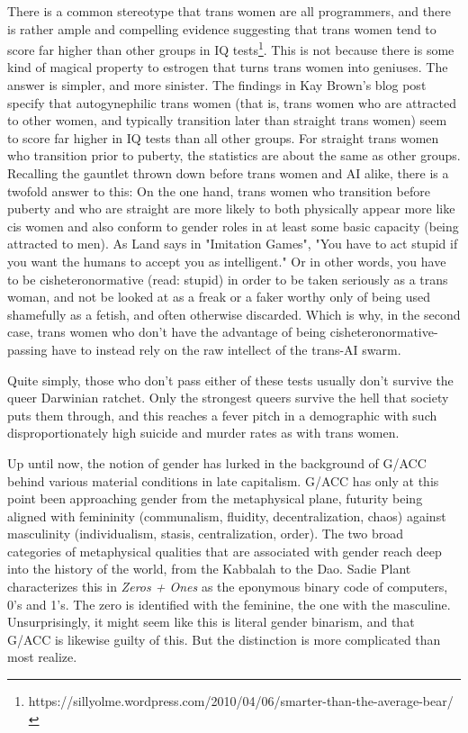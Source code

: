 \documentclass[12pt, a5paper, twoside, openright]{memoir}
\begin{document}
There is a common stereotype that trans women are all programmers, and there is rather ample and compelling evidence suggesting that trans women tend to score far higher than other groups in IQ tests\footnote{https://sillyolme.wordpress.com/2010/04/06/smarter-than-the-average-bear/}. This is not because there is some kind of magical property to estrogen that turns trans women into geniuses. The answer is simpler, and more sinister. The findings in Kay Brown's blog post specify that autogynephilic trans women (that is, trans women who are attracted to other women, and typically transition later than straight trans women) seem to score far higher in IQ tests than all other groups. For straight trans women who transition prior to puberty, the statistics are about the same as other groups. Recalling the gauntlet thrown down before trans women and AI alike, there is a twofold answer to this: On the one hand, trans women who transition before puberty and who are straight are more likely to both physically appear more like cis women and also conform to gender roles in at least some basic capacity (being attracted to men). As Land says in "Imitation Games", "You have to act stupid if you want the humans to accept you as intelligent." Or in other words, you have to be cisheteronormative (read: stupid) in order to be taken seriously as a trans woman, and not be looked at as a freak or a faker worthy only of being used shamefully as a fetish, and often otherwise discarded. Which is why, in the second case, trans women who don't have the advantage of being cisheteronormative-passing have to instead rely on the raw intellect of the trans-AI swarm.

Quite simply, those who don't pass either of these tests usually don't survive the queer Darwinian ratchet. Only the strongest queers survive the hell that society puts them through, and this reaches a fever pitch in a demographic with such disproportionately high suicide and murder rates as with trans women.

Up until now, the notion of gender has lurked in the background of G/ACC behind various material conditions in late capitalism. G/ACC has only at this point been approaching gender from the metaphysical plane, futurity being aligned with femininity (communalism, fluidity, decentralization, chaos) against masculinity (individualism, stasis, centralization, order). The two broad categories of metaphysical qualities that are associated with gender reach deep into the history of the world, from the Kabbalah to the Dao. Sadie Plant characterizes this in \textit{Zeros + Ones} as the eponymous binary code of computers, 0's and 1's. The zero is identified with the feminine, the one with the masculine. Unsurprisingly, it might seem like this is literal gender binarism, and that G/ACC is likewise guilty of this. But the distinction is more complicated than most realize.
\end{document}
